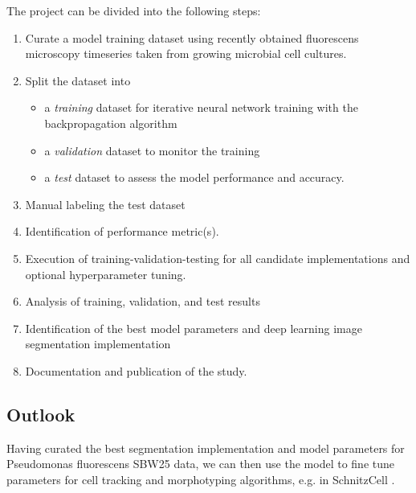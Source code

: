 \documentclass[a4paper]{article}
\begin{document}
The project can be divided into the following steps:
\begin{enumerate}
    \item Curate a model training dataset using recently
          obtained fluorescens microscopy timeseries taken from growing microbial cell cultures.
    \item Split the dataset into
        \begin{itemize}
            \item a \emph{training} dataset for iterative neural network training with the backpropagation
                algorithm 
            \item a \emph{validation} dataset to monitor the training
            \item a \emph{test} dataset to assess the model performance and accuracy.
        \end{itemize}
    \item Manual labeling the test dataset
    \item Identification of performance metric(s).
    \item Execution of training-validation-testing for all candidate implementations and optional hyperparameter tuning.
    \item Analysis of training, validation, and test results
    \item Identification of the best model parameters and deep learning image segmentation implementation
    \item Documentation and publication of the study. 
\end{enumerate}

\subsection{Outlook}
Having curated the best segmentation implementation and model parameters for Pseudomonas fluorescens SBW25 data, we can
then use the model to fine tune parameters for cell tracking and morphotyping algorithms, e.g. in SchnitzCell \cite{Young2012}. 

\printbibliography
\end{document}

